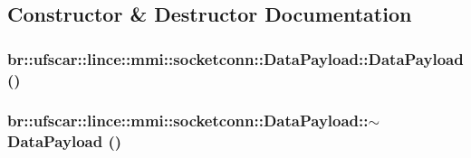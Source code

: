 \subsection{Constructor \& Destructor Documentation}
\hypertarget{classbr_1_1ufscar_1_1lince_1_1mmi_1_1socketconn_1_1DataPayload_a505286f74ce4de188aa2a4766039e59f}{
\subsubsection[{DataPayload}]{\setlength{\rightskip}{0pt plus 5cm}br::ufscar::lince::mmi::socketconn::DataPayload::DataPayload ()}}
\label{classbr_1_1ufscar_1_1lince_1_1mmi_1_1socketconn_1_1DataPayload_a505286f74ce4de188aa2a4766039e59f}
\hypertarget{classbr_1_1ufscar_1_1lince_1_1mmi_1_1socketconn_1_1DataPayload_aacb1558c005cdbb39a0f935c9767486c}{
\subsubsection[{$\sim$DataPayload}]{\setlength{\rightskip}{0pt plus 5cm}br::ufscar::lince::mmi::socketconn::DataPayload::$\sim$DataPayload ()}}
\label{classbr_1_1ufscar_1_1lince_1_1mmi_1_1socketconn_1_1DataPayload_aacb1558c005cdbb39a0f935c9767486c}


